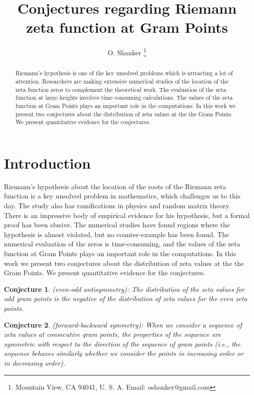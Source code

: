 \documentclass[twoside]{article}
\newtheorem{mydef}{Conjecture}
\begin{document}
\date{}
\lhead[]{}
\rhead[]{}

\title{\bf{Conjectures regarding Riemann zeta function at Gram Points}}


\author{O. Shanker 
 \thanks{Mountain View, CA 94041, U. S. A. Email: oshanker@gmail.com
 }
}

\maketitle
\thispagestyle{fancy}

\begin{abstract}
Riemann's hypothesis is one of the key unsolved problems which is attracting
a lot of attention. 
Researchers are making extensive numerical studies of the location of the 
zeta function zeros to complement the theoretical work. 
The evaluation of the zeta function at large heights involves time consuming
calculations. The values of the 
zeta function at Gram Points plays an important role in the computations. In 
this work we present two conjectures about the distribution of zeta values at the 
the Gram Points. We present quantitative evidence for the conjectures.
\end{abstract}




\clearpage
{}


\section{Introduction}
Riemann's hypothesis about the location of 
the roots of the Riemann zeta function is a key unsolved problem in mathematics,
which challenges us to this day. The study also has ramifications in physics and
random matrix theory. 
There is an impressive body of empirical evidence for his hypothesis,
but a formal proof has been elusive. The numerical studies have found
regions where the hypothesis is almost violated, but no counter-example has
been found. The numerical evaluation of the zeros is time-consuming, and the values of the 
zeta function at Gram Points plays an important role in the computations. In 
this work we present two conjectures about the distribution of zeta values at the 
the Gram Points. We present quantitative evidence for the conjectures. 
\begin{mydef}\label{antisymmetry}
(even-odd antisymmetry): The distribution of the zeta values for odd gram points is the negative of the distribution of zeta values for the even zeta points.
\end{mydef}
\begin{mydef}\label{symmetry}
(forward-backward symmetry): When we consider a sequence of zeta values at consecutive gram points, the properties of the sequence are symmetric with respect to the direction of the sequence of gram points (i.e., the sequence behaves similarly whether we consider the points in increasing order or in decreasing order).
\end{mydef}
\end{document}
